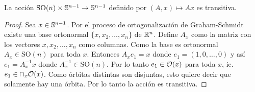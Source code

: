 \begin{ejercicio}\label{ej:79}
  La acci\'on $\text{SO}(n)\times\mathbb{S}^{n-1}\rightarrow\mathbb{S}^{n-1}$ definido por $(A,x)\mapsto Ax$ es
  transitiva.
\end{ejercicio}
\begin{proof}%
  Sea $x\in\mathbb{S}^{n-1}$. Por el proceso de ortogonalizaci\'on de Graham-Schmidt existe
  una base ortonormal $\{x,x_2,\ldots,x_n\}$ de $\mathbb{R}^n$. Define $A_x$ como la matriz
  con los vectores $x,x_2,\ldots,x_n$ como columnas. Como la base es ortonormal
  $A_x\in\text{SO}(n)$ para toda $x$. Entonces $A_xe_1=x$ donde $e_1=(1,0,\ldots,0)$ y
  as\'i $e_1=A_x^{-1}x$ donde $A_x^{-1}\in\text{SO}(n)$. Por lo tanto $e_1\in\mathcal{O}(x)$ para
  toda $x$, ie. $e_1\in\cap_x\mathcal{O}(x)$. Como \'orbitas distintas son disjuntas,
  esto quiere decir que solamente hay una \'orbita. Por lo tanto la acci\'on es transitiva.
\end{proof}%

